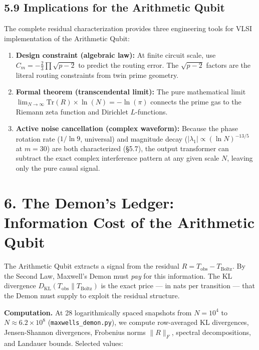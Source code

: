 \documentclass[
  11pt,
]{article}
\numberwithin{equation}{section}
\begin{document}
\subsection{5.9 Implications for the Arithmetic
Qubit}\label{implications-for-the-arithmetic-qubit}

The complete residual characterization provides three engineering tools
for VLSI implementation of the Arithmetic Qubit:

\begin{enumerate}
\def\labelenumi{\arabic{enumi}.}
\item
  \textbf{Design constraint (algebraic law):} At finite circuit scale,
  use \(C_m = -\frac{2}{3} \prod \sqrt{p-2}\) to predict the routing
  error. The \(\sqrt{p-2}\) factors are the literal routing constraints
  from twin prime geometry.
\item
  \textbf{Formal theorem (transcendental limit):} The pure mathematical
  limit \(\lim_{N \to \infty} \text{Tr}(R) \times \ln(N) = -\ln(\pi)\)
  connects the prime gas to the Riemann zeta function and Dirichlet
  \(L\)-functions.
\item
  \textbf{Active noise cancellation (complex waveform):} Because the
  phase rotation rate (\(1/\ln 9\), universal) and magnitude decay
  (\(|\lambda_1| \propto (\ln N)^{-13/5}\) at \(m = 30\)) are both
  characterized (§5.7), the output transformer can subtract the exact
  complex interference pattern at any given scale \(N\), leaving only
  the pure causal signal.
\end{enumerate}

\setcounter{section}{6}\setcounter{equation}{0}
\setcounter{section}{6}\setcounter{equation}{0}
\section{6. The Demon's Ledger: Information Cost of the Arithmetic
Qubit}\label{the-demons-ledger-information-cost-of-the-arithmetic-qubit}

The Arithmetic Qubit extracts a signal from the residual
\(R = T_{\text{obs}} - T_{\text{Boltz}}\). By the Second Law, Maxwell's
Demon must \emph{pay} for this information. The KL divergence
\(D_{\text{KL}}(T_{\text{obs}} \| T_{\text{Boltz}})\) is the exact price
--- in nats per transition --- that the Demon must supply to exploit the
residual structure.

\textbf{Computation.} At 28 logarithmically spaced snapshots from
\(N = 10^4\) to \(N \approx 6.2 \times 10^8\)
(\texttt{maxwells\_demon.py}), we compute row-averaged KL divergences,
Jensen-Shannon divergences, Frobenius norms \(\|R\|_F\), spectral
decompositions, and Landauer bounds. Selected values:
\end{document}
